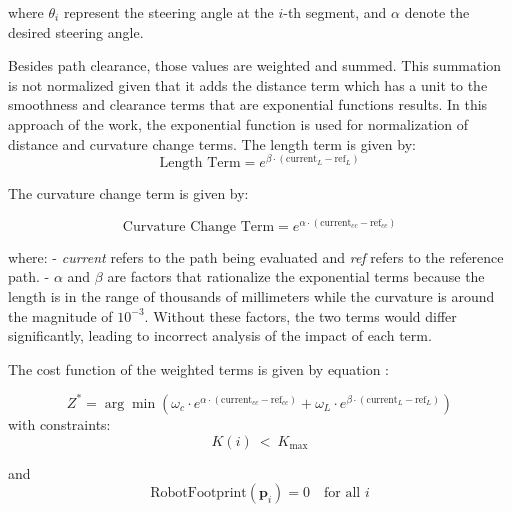 where \( \theta_i \) represent the steering angle at the \(i\)-th segment, and \( \alpha \) denote the desired 
steering angle.

Besides path clearance, those values are weighted and summed.
This summation is not normalized given that it adds the distance term which has a unit to the smoothness and 
clearance terms that are exponential functions results. 
In this approach of the work, the exponential function is used for normalization of distance and curvature change 
terms. The length term is given by:
\begin{equation}
    \text{Length Term} = e^{\beta \cdot \left(\text{current}_L - \text{ref}_L\right)}
    \end{equation}
    
    \noindent
    The curvature change term is given by:
    \noindent
    
    \begin{equation}
    \text{Curvature Change Term} = e^{\alpha \cdot \left(\text{current}_{cc} - \text{ref}_{cc}\right)}
    \end{equation}
    
    \noindent
    where: 
    \newline
    - \textit{current} refers to the path being evaluated and \textit{ref} refers to the reference path.
    \newline
    - \(\alpha\) and \(\beta\) are factors that rationalize the exponential terms because the length is in the range 
    of thousands of millimeters while the curvature is around the magnitude of \(10^{-3}\).
    Without these factors, the two terms would differ significantly, leading to incorrect analysis of the impact of each term.
    
\noindent The cost function of the weighted terms is given by equation :

\begin{equation}
Z^{\ast }=\arg \min \left(\omega_{c} \cdot e^{\alpha \cdot \left( \text{current}_{cc} - \text{ref}_{cc} \right)} + \omega_{L} 
\cdot e^{\beta \cdot \left( \text{current}_L - \text{ref}_L \right)} \right)
\label{exp_function}
\end{equation}
\noindent
with constraints: \[K(i)\ <\ K_{\max}\]
\noindent

and \[\text{RobotFootprint}(\mathbf{p}_i) = 0 \quad \text{for all } i\]


